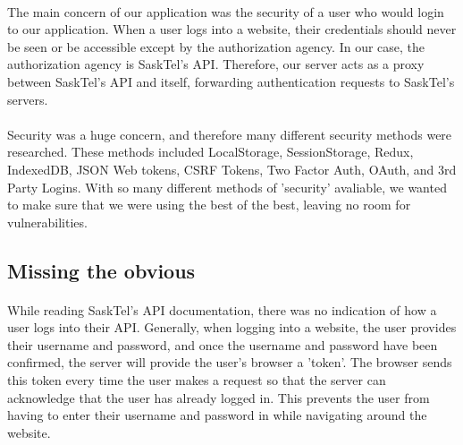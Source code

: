 \documentclass[12pt]{article}
\begin{document}
\paragraph{}
	The main concern of our application was the security of a user who would login to our application. When a user logs into a website, their credentials should never be seen or be accessible except by the authorization agency. In our case, the authorization agency is SaskTel's API. Therefore, our server acts as a proxy between SaskTel's API and itself, forwarding authentication requests to SaskTel's servers.
\paragraph{}	
	Security was a huge concern, and therefore many different security methods were researched. These methods included LocalStorage, SessionStorage, Redux, IndexedDB, JSON Web tokens, CSRF Tokens, Two Factor Auth, OAuth, and 3rd Party Logins. With so many different methods of 'security' avaliable, we wanted to make sure that we were using the best of the best, leaving no room for vulnerabilities.

\subsection{Missing the obvious}
\paragraph{}	
	While reading SaskTel's API documentation, there was no indication of how a user logs into their API. Generally, when logging into a website, the user provides their username and password, and once the username and password have been confirmed, the server will provide the user's browser a 'token'. The browser sends this token every time the user makes a request so that the server can acknowledge that the user has already logged in. This prevents the user from having to enter their username and password in while navigating around the website. 
\end{document}
